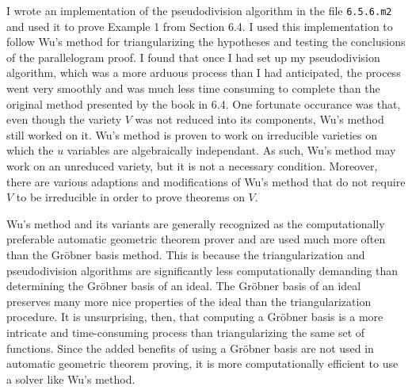 \documentclass[12pt]{article}
\theoremstyle{plain}
\theoremstyle{definition}
\theoremstyle{remark}
\newcommand{\gro}{Gr\"obner }
\begin{document}
I wrote an implementation of the pseudodivision algorithm in the file \texttt{6.5.6.m2} and used it to prove Example 1 from Section 6.4. 
I used this implementation to follow Wu's method for triangularizing the hypotheses and testing the conclusions of the parallelogram proof.
I found that once I had set up my pseudodivision algorithm, which was a more arduous process than I had anticipated, 
the process went very smoothly and was much less time consuming to complete than the original method presented by the book in 6.4.
One fortunate occurance was that, even though the variety $V$ was not reduced into its components, Wu's method still worked on it.
Wu's method is proven to work on irreducible varieties on which the $u$ variables are algebraically independant.
As such, Wu's method may work on an unreduced variety, but it is not a necessary condition.
Moreover, there are various adaptions and modifications of Wu's method that do not require $V$ to be irreducible in order to prove theorems on $V$.

Wu's method and its variants are generally recognized as the computationally preferable automatic geometric theorem prover and are used much more often than the Gröbner basis method.
This is because the triangularization and pseudodivision algorithms are significantly less computationally demanding than determining the Gröbner basis of an ideal.
The \gro basis of an ideal preserves many more nice properties of the ideal than the triangularization procedure. 
It is unsurprising, then, that computing a \gro basis is a more intricate and time-consuming process than triangularizing the same set of functions.
Since the added benefits of using a \gro basis are not used in automatic geometric theorem proving, it is more computationally efficient to use a solver like Wu's method.
\end{document}
